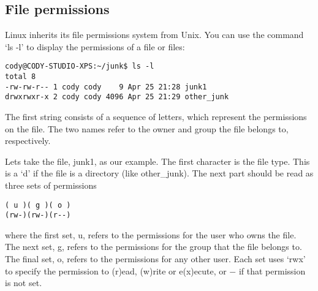 \documentclass{article}
\begin{document}
\subsection{File permissions}
Linux inherits its file permissions system from Unix. You can use the command `ls -l' to display the permissions of a file or files:
\begin{verbatim}
cody@CODY-STUDIO-XPS:~/junk$ ls -l
total 8
-rw-rw-r-- 1 cody cody    9 Apr 25 21:28 junk1
drwxrwxr-x 2 cody cody 4096 Apr 25 21:29 other_junk
\end{verbatim}
The first string consists of a sequence of letters, which represent the permissions on the file. The two names refer to the owner and group the file belongs to, respectively.

Lets take the file, junk1, as our example.
The first character is the file type. This is a `d' if the file is a directory (like other\_junk).
The next part should be read as three sets of permissions
\begin{verbatim}
( u )( g )( o ) 
(rw-)(rw-)(r--)
\end{verbatim} 
where the first set, u, refers to the permissions for the user who owns the file.
The next set, g, refers to the permissions for the group that the file belongs to.
The final set, o, refers to the permissions for any other user. 
Each set uses `rwx' to specify the permission to (r)ead, (w)rite or e(x)ecute, or $-$ if that permission is not set.
\end{document}

